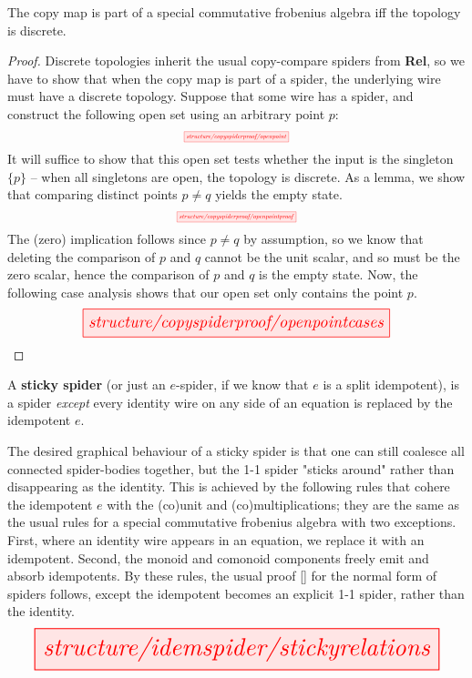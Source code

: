 \begin{myboxR}
\begin{proposition}\label{prop:copydiscrete}
The copy map is part of a special commutative frobenius algebra iff the topology is discrete.
\begin{proof}
Discrete topologies inherit the usual copy-compare spiders from \textbf{Rel}, so we have to show that when the copy map is part of a spider, the underlying wire must have a discrete topology. Suppose that some wire has a spider, and construct the following open set using an arbitrary point $p$:
\[\scalebox{0.5}{\tikzfig{structure/copyspiderproof/openpoint}}\]
It will suffice to show that this open set tests whether the input is the singleton $\{p\}$ -- when all singletons are open, the topology is discrete. As a lemma, we show that comparing distinct points $p \neq q$ yields the empty state.
\[\scalebox{0.5}{\tikzfig{structure/copyspiderproof/openpointproof}}\]
The (zero) implication follows since $p \neq q$ by assumption, so we know that deleting the comparison of $p$ and $q$ cannot be the unit scalar, and so must be the zero scalar, hence the comparison of $p$ and $q$ is the empty state. Now, the following case analysis shows that our open set only contains the point $p$.
\[\resizebox{0.75\textwidth}{!}{\tikzfig{structure/copyspiderproof/openpointcases}}\]
\end{proof}
\end{proposition}
\end{myboxR}

\begin{myboxB}
\begin{defn}\label{defn:stickyspider}
A \textbf{sticky spider} (or just an $e$-spider, if we know that $e$ is a split idempotent), is a spider \emph{except} every identity wire on any side of an equation is replaced by the idempotent $e$.
\end{defn}

The desired graphical behaviour of a sticky spider is that one can still coalesce all connected spider-bodies together, but the 1-1 spider "sticks around" rather than disappearing as the identity. This is achieved by the following rules that cohere the idempotent $e$ with the (co)unit and (co)multiplications; they are the same as the usual rules for a special commutative frobenius algebra with two exceptions. First, where an identity wire appears in an equation, we replace it with an idempotent. Second, the monoid and comonoid components freely emit and absorb idempotents. By these rules, the usual proof [] for the normal form of spiders follows, except the idempotent becomes an explicit 1-1 spider, rather than the identity.
\[\resizebox{\textwidth}{!}{\tikzfig{structure/idemspider/stickyrelations}}\]
\end{myboxB}

